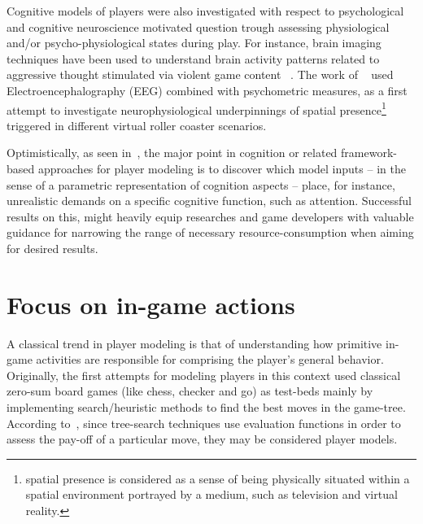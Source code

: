 Cognitive models of players were also investigated with respect to psychological and cognitive neuroscience motivated question trough assessing physiological and/or psycho-physiological states during play. For instance, brain imaging techniques have been used to understand brain activity patterns related to aggressive thought stimulated via violent game content ~\citep{weber_does_2006}. The work of ~\cite{baumgartner_neural_2006} used Electroencephalography (EEG) combined with psychometric measures, as a first attempt to investigate neurophysiological underpinnings of spatial presence\footnote{spatial presence is considered as a sense of being physically situated within a spatial environment portrayed by a medium, such as television and virtual reality.} triggered in different virtual roller coaster scenarios.

Optimistically, as seen in~\cite{bohil_cognitive_2007}, the major point in cognition or related framework-based approaches for player modeling is to discover which model inputs -- in the sense of a parametric representation of cognition aspects -- place, for instance, unrealistic demands on a specific cognitive function, such as attention. Successful results on this, might heavily equip researches and game developers with valuable guidance for narrowing the range of necessary resource-consumption when aiming for desired results.   

\section{Focus on in-game actions}\label{sec:in_game_action_reviews}
A classical trend in player modeling is that of understanding how primitive in-game activities are responsible for comprising the player's general behavior. Originally, the first attempts for modeling players in this context used classical zero-sum board games (like chess, checker and go) as test-beds mainly by implementing search/heuristic methods to find the best moves in the game-tree. According to~\cite{bakkes_player_2012}, since tree-search techniques use evaluation functions in order to assess the pay-off of a particular move, they may be considered player models.

